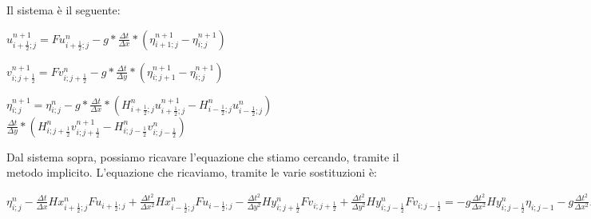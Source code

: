 \documentclass{beamer}
\begin{document}
	\begin{frame}
		Il sistema è il seguente:\\
		\begin{center}
	
			$ u_{i + \frac{1}{2} ; j}^{n+1} = Fu_{i + \frac{1}{2}; j} ^{n}  - g*\frac{\Delta t}{\Delta x} *( \eta_{i+1; j} ^{n+1} -\eta_{i; j} ^{n+1}) $
			
			$ v_{i ; j + \frac{1}{2}}^{n+1} = Fv_{i;j  + \frac{1}{2}} ^{n}  - g*\frac{\Delta t}{\Delta y} *( \eta_{i; j+1} ^{n+1} -\eta_{i; j} ^{n+1}) $
				
				$ \eta_{i ; j}^{n+1} = \eta_{i ;j} ^{n}  - g*\frac{\Delta t}{\Delta x} *( H_{i+ \frac{1}{2} ; j}^n u_{i+\frac{1}{2};j}^{n+1} - H_{i-\frac{1}{2};j}^{n} u_{i-\frac{1}{2};j}^{n}) $ \\
				$\frac{\Delta t}{\Delta y} *( H_{i; j+ \frac{1}{2}}^{n} v_{i; j+\frac{1}{2}}^{n+1} - H_{i;j-\frac{1}{2}}^{n} v_{i;j-\frac{1}{2}}^{n}) $ 
		\end{center}

	\end{frame}

\begin{frame}
	Dal sistema sopra, possiamo ricavare l'equazione che stiamo cercando, tramite il metodo implicito. 
	L'equazione che ricaviamo, tramite le varie sostituzioni è:
	
	$ \eta_{i;j}^{n} - \frac{\Delta t}{\Delta x}Hx_{i+\frac{1}{2};j}^{n} Fu_{i+\frac{1}{2};j} + \frac{\Delta t^{2}}{\Delta x^{2}}Hx_{i-\frac{1}{2};j}^{n} Fu_{i-\frac{1}{2};j} -\frac{\Delta t^{2}}{\Delta y^{2}}Hy_{i;j+\frac{1}{2}}^{n} Fv_{i;j+\frac{1}{2}}  + \frac{\Delta t^{2}}{\Delta y^{2}}Hy_{i;j-\frac{1}{2}}^{n} Fv_{i;j-\frac{1}{2}} = -g\frac{\Delta t^{2}}{\Delta x^{2}}Hy_{i;j-\frac{1}{2}}^{n} \eta_{i;j-1} -g\frac{\Delta t^{2}}{\Delta x^{2}}Hx_{i;j-\frac{1}{2}}^{n}  \eta_{i-1;j} + (1 + g(\frac{\Delta t^{2}}{\Delta x^{2}}Hx_{i+\frac{1}{2}; j}^{n} +\frac{\Delta t^{2}}{\Delta x^{2}}Hx_{i-\frac{1}{2}; j}^{n} + \frac{\Delta t^{2}}{\Delta y^{2}}Hy_{i;j+\frac{1}{2}}^{n} + \frac{\Delta t^{2}}{\Delta y^{2}}Hy_{i;j-\frac{1}{2}}^{n} ) )\eta_{i;j}^{n+1} - g\frac{\Delta t^{2}}{\Delta x^{2}}Hx_{i+;\frac{1}{2} ; j}^{n}  \eta_{i+1;j}^{n+1} - g\frac{\Delta t^{2}}{\Delta y^{2}}Hy_{i+;\frac{1}{2} ; j}^{n}  \eta_{i;j+1}^{n+1}	$
\end{frame}
\end{document}
